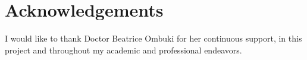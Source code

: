 \thispagestyle{empty}
\section*{Acknowledgements}

I would like to thank Doctor Beatrice Ombuki for her continuous support, in this project and throughout my academic and professional endeavors.
